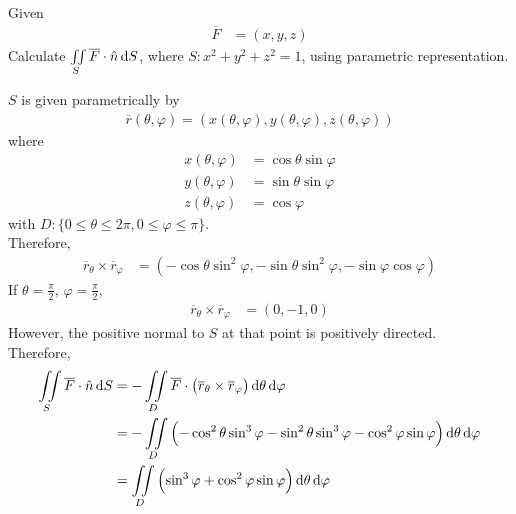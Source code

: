 \documentclass[fleqn, a4paper, 12pt, twoside]{article}
\theoremstyle{definition}
\theoremstyle{theorem}
\begin{document}
{\begin{question}
	Given
	\begin{align*}
		\overline{F} & = (x,y,z)
	\end{align*}
	Calculate $\iint\limits_{S} \overline{F} \cdot \hat{n} \dif S$, where $S : x^2 + y^2 + z^2 = 1$, using parametric representation.
\end{question}

\begin{solution}
	$S$ is given parametrically by
	\begin{align*}
		\overline{r}(\theta,\varphi) = \left( x(\theta,\varphi) , y(\theta,\varphi) , z(\theta,\varphi) \right)
	\end{align*}
	where
	\begin{align*}
		x(\theta,\varphi) & = \cos \theta \sin \varphi \\
		y(\theta,\varphi) & = \sin \theta \sin \varphi \\
		z(\theta,\varphi) & = \cos \varphi
	\end{align*}
	with $D : \{0 \le \theta \le 2 \pi , 0 \le \varphi \le \pi\}$.\\
	Therefore,
	\begin{align*}
		\overline{r}_{\theta} \times \overline{r}_{\varphi} & = \left( -\cos \theta \sin^2 \varphi , -\sin \theta \sin^2 \varphi , -\sin \varphi \cos \varphi \right)
	\end{align*}
	If $\theta = \frac{\pi}{2}$, $\varphi = \frac{\pi}{2}$,
	\begin{align*}
		\overline{r}_{\theta} \times \overline{r}_{\varphi} & = (0,-1,0)
	\end{align*}
	However, the positive normal to $S$ at that point is positively directed.\\
	Therefore,
	\begin{align*}
		\iint\limits_{S} \overline{F} \cdot \hat{n} \dif S & = -\iint\limits_{D} \overline{F} \cdot \left( \overline{r}_{\theta} \times \overline{r}_{\varphi} \right) \dif \theta \dif \varphi                     \\
                                                                   & = -\iint\limits_{D} \left( -\cos^2 \theta \sin^3 \varphi - \sin^2 \theta \sin^3 \varphi - \cos^2 \varphi \sin \varphi \right) \dif \theta \dif \varphi \\
                                                                   & = \iint\limits_{D} \left( \sin^3 \varphi + \cos^2 \varphi \sin \varphi \right) \dif \theta \dif \varphi                                                \\

\end{align*}
\end{solution}}
\end{document}
